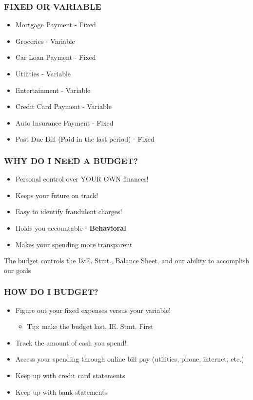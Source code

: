 \documentclass[12pt]{article}
\begin{document}
            \subsubsection{FIXED OR VARIABLE}
                \begin{itemize}
                    \item Mortgage Payment - Fixed
                    \item Groceries - Variable
                    \item Car Loan Payment - Fixed
                    \item Utilities - Variable
                    \item Entertainment - Variable
                    \item Credit Card Payment - Variable
                    \item Auto Insurance Payment - Fixed
                    \item Past Due Bill (Paid in the last period) - Fixed
                \end{itemize}
            \subsubsection{WHY DO I NEED A BUDGET?}
                \begin{itemize}
                    \item Personal control over YOUR OWN finances!
                    \item Keeps your future on track!
                    \item Easy to identify fraudulent charges!
                    \item Holds you accountable - \textbf{Behavioral}
                    \item Makes your spending more transparent
                \end{itemize}
                The budget controls the I\&E. Stmt., Balance Sheet, and our ability to accomplish our goals
            \subsubsection{HOW DO I BUDGET?}
                \begin{itemize}
                    \item Figure out your fixed expenses versus your variable!
                        \begin{itemize}
                            \item Tip: make the budget last, IE. Stmt. First
                        \end{itemize}
                    \item Track the amount of cash you spend!
                    \item Access your spending through online bill pay (utilities, phone, internet, etc.)
                    \item Keep up with credit card statements
                    \item Keep up with bank statements
                \end{itemize}
\end{document}
